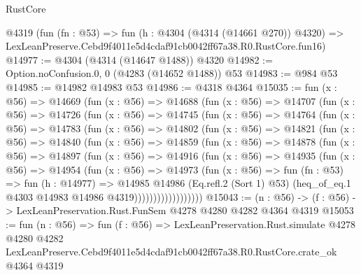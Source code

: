 \begin{lexlean}{RustCore}
\begin{coremodule}
    @4319
    (fun (fn : @53) =>
    fun (h : @4304 (@4314 (@14661 @270)) @4320) =>
    LexLeanPreserve.Cebd9f4011e5d4cdaf91cb0042ff67a38.R0.RustCore.fun16)
@14977 := @4304 (@4314 (@14647 @1488)) @4320
@14982 := Option.noConfusion.{0, 0} (@4283 (@14652 @1488)) @53
@14983 := @984 @53
@14985 := @14982 @14983 @53
@14986 := @4318 @4364
@15035 := fun (x : @56) =>
  @14669
    (fun (x : @56) =>
    @14688
      (fun (x : @56) =>
      @14707
        (fun (x : @56) =>
        @14726
          (fun (x : @56) =>
          @14745
            (fun (x : @56) =>
            @14764
              (fun (x : @56) =>
              @14783
                (fun (x : @56) =>
                @14802
                  (fun (x : @56) =>
                  @14821
                    (fun (x : @56) =>
                    @14840
                      (fun (x : @56) =>
                      @14859
                        (fun (x : @56) =>
                        @14878
                          (fun (x : @56) =>
                          @14897
                            (fun (x : @56) =>
                            @14916
                              (fun (x : @56) =>
                              @14935
                                (fun (x : @56) =>
                                @14954
                                  (fun (x : @56) =>
                                  @14973
                                    (fun (x : @56) =>
                                    fun (fn : @53) =>
                                    fun (h : @14977) =>
                                    @14985
                                      @14986
                                      (Eq.refl.{2} (Sort 1) @53)
                                      (heq_of_eq.{1} @4303 @14983 @14986 @4319))))))))))))))))))
@15043 := (n : @56) -> (f : @56) -> LexLeanPreservation.Rust.FunSem @4278 @4280 @4282 @4364 @4319
@15053 := fun (n : @56) =>
  fun (f : @56) =>
  LexLeanPreservation.Rust.simulate
    @4278
    @4280
    @4282
    LexLeanPreserve.Cebd9f4011e5d4cdaf91cb0042ff67a38.R0.RustCore.crate_ok
    @4364
    @4319
\end{coremodule}
\end{lexlean}
